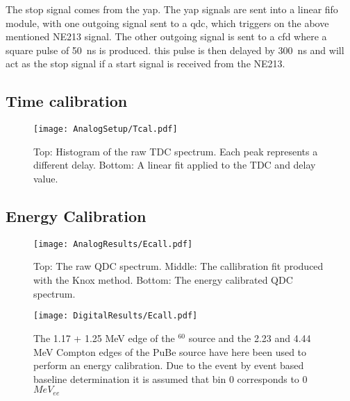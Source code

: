 \documentclass[main.tex]{subfiles}
\begin{document}
The stop signal comes from the yap. The yap signals are sent into a linear fifo module, with one outgoing signal sent to a qdc, which triggers on the above mentioned NE213 signal. %
The other outgoing signal is sent to a cfd where a square pulse of \SI{50}{\nano\second} is produced. this pulse is then delayed by \SI{300}{\nano\second} and will act as the stop signal if a start signal is received from the NE213. %
\subsection{Time calibration}
\begin{figure}[ht]
	\centering
    	\texttt{[image: AnalogSetup/Tcal.pdf]}
        \caption{Top: Histogram of the raw TDC spectrum. Each peak represents a different delay. Bottom: A linear fit applied to the TDC and delay value.}
	    \label{fig:Tcal} 
\end{figure}

\subsection{Energy Calibration}
\begin{figure}[ht!]
    \centering
        \texttt{[image: AnalogResults/Ecall.pdf]}
        \caption{Top: The raw QDC spectrum. Middle: The callibration fit produced with the Knox method. Bottom: The energy calibrated QDC spectrum.}
    \label{fig:qdc_a}
\end{figure}

\begin{figure}[ht]
    \centering
        \texttt{[image: DigitalResults/Ecall.pdf]}
        \caption{The 1.17 + 1.25 MeV edge of the $^60$ source and the 2.23 and 4.44 MeV Compton edges of the PuBe source have here been used to perform an energy calibration. Due to the event by event based baseline determination it is assumed that bin 0 corresponds to 0 $MeV_{ee}$}
    \label{fig:D_QDC}
\end{figure}
\end{document}
